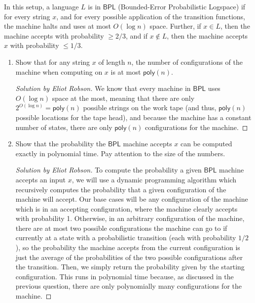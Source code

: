 \documentclass{article}
\newenvironment{solution}[1]{\begin{proof}[Solution by #1]}{\end{proof}}
\newcommand{\poly}{\mathsf{poly}}
\newcommand{\BPL}{\mathsf{BPL}}
\begin{document}
In this setup, a language \(L\) is in \(\BPL\) (Bounded-Error Probabilistic Logspace) if for every string \(x\), and for every possible application of the transition functions, the machine halts and uses at most \(O(\log n)\) space. Further, if \(x \in L\), then the machine accepts with probability \(\geq 2/3\), and if \(x \notin L\), then the machine accepts \(x\) with probability \(\leq 1/3\).

\begin{enumerate}
	\item Show that for any string \(x\) of length \(n\), the number of configurations of the machine when computing on \(x\) is at most \(\poly(n)\).
    
    \begin{solution}{Eliot Robson}
        We know that every machine in \(\BPL\) uses \(O(\log n)\) space at the most, meaning that there are only \(2^{O(\log n)} = \poly(n)\) possible strings on the work tape (and thus, \(\poly(n)\) possible locations for the tape head), and because the machine has a constant number of states, there are only \(\poly(n)\) configurations for the machine.
    \end{solution}
	
	\item Show that the probability the \(\BPL\) machine accepts \(x\) can be computed exactly in polynomial time. Pay attention to the size of the numbers. %
    
    \begin{solution}{Eliot Robson}
        To compute the probability a given \(\BPL\) machine accepts an input \(x\), we will use a dynamic programming algorithm which recursively computes the probability that a given configuration of the machine will accept. Our base cases will be any configuration of the machine which is in an accepting configuration, where the machine clearly accepts with probability 1. Otherwise, in an arbitrary configuration of the machine, there are at most two possible configurations the machine can go to if currently at a state with a probabilistic transition (each with probability \(1/2\)), so the probability the machine accepts from the current configuration is just the average of the probabilities of the two possible configurations after the transition. Then, we simply return the probability given by the starting configuration. This runs in polynomial time because, as discussed in the previous question, there are only polynomially many configurations for the machine.
    \end{solution}
	

\end{enumerate}
\end{document}
